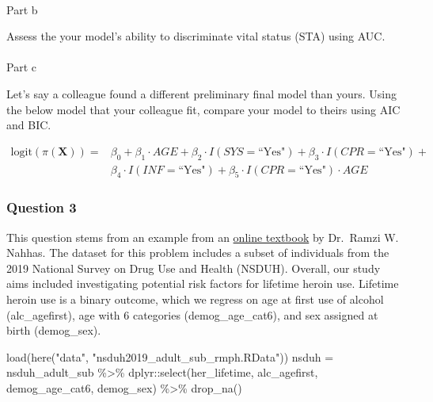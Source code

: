 \documentclass[
  letterpaper,
  DIV=11,
  numbers=noendperiod]{scrartcl}
\makeatletter
\let\oldparagraph\paragraph
\renewcommand{\paragraph}{
    \@ifstar
      \xxxParagraphStar
      \xxxParagraphNoStar
  }
\newcommand{\xxxParagraphStar}[1]{\oldparagraph*{#1}\mbox{}}
\newcommand{\xxxParagraphNoStar}[1]{\oldparagraph{#1}\mbox{}}
\newenvironment{Shaded}{\begin{snugshade}}{\end{snugshade}}
\newcommand{\FunctionTok}[1]{\textcolor[rgb]{0.28,0.35,0.67}{#1}}
\newcommand{\NormalTok}[1]{\textcolor[rgb]{0.00,0.23,0.31}{#1}}
\newcommand{\OtherTok}[1]{\textcolor[rgb]{0.00,0.23,0.31}{#1}}
\newcommand{\SpecialCharTok}[1]{\textcolor[rgb]{0.37,0.37,0.37}{#1}}
\newcommand{\StringTok}[1]{\textcolor[rgb]{0.13,0.47,0.30}{#1}}
\makeatother
\begin{document}
\paragraph{Part b}\label{part-b-1}

Assess the your model's ability to discriminate vital status (STA) using
AUC.

\paragraph{Part c}\label{part-c-1}

Let's say a colleague found a different preliminary final model than
yours. Using the below model that your colleague fit, compare your model
to theirs using AIC and BIC.

\[\begin{align} \text{logit}(\pi(\textbf{X})) = & \beta_0 + \beta_1 \cdot AGE + \beta_2 \cdot I(SYS=\text{``Yes"}) + \beta_3 \cdot I(CPR=\text{``Yes"}) + \\ & \beta_4 \cdot I(INF=\text{``Yes"}) + \beta_5 \cdot I(CPR=\text{``Yes"}) \cdot AGE \end{align}\]

\subsubsection{Question 3}\label{question-3}

This question stems from an example from an
\href{https://bookdown.org/rwnahhas/RMPH/}{online textbook} by Dr.~Ramzi
W. Nahhas. The dataset for this problem includes a subset of individuals
from the 2019 National Survey on Drug Use and Health (NSDUH). Overall,
our study aims included investigating potential risk factors for
lifetime heroin use. Lifetime heroin use is a binary outcome, which we
regress on age at first use of alcohol (alc\_agefirst), age with 6
categories (demog\_age\_cat6), and sex assigned at birth (demog\_sex).

\begin{Shaded}
\begin{Highlighting}[]
\FunctionTok{load}\NormalTok{(}\FunctionTok{here}\NormalTok{(}\StringTok{"data"}\NormalTok{, }\StringTok{"nsduh2019\_adult\_sub\_rmph.RData"}\NormalTok{))}
\NormalTok{nsduh }\OtherTok{=}\NormalTok{ nsduh\_adult\_sub }\SpecialCharTok{\%\textgreater{}\%} 
\NormalTok{  dplyr}\SpecialCharTok{::}\FunctionTok{select}\NormalTok{(her\_lifetime, alc\_agefirst, demog\_age\_cat6, demog\_sex) }\SpecialCharTok{\%\textgreater{}\%} 
  \FunctionTok{drop\_na}\NormalTok{()}
\end{Highlighting}
\end{Shaded}
\end{document}

